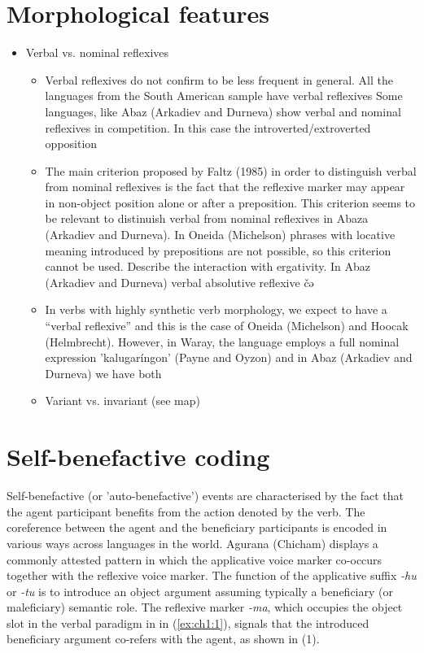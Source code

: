 \documentclass[output=paper]{langsci/langscibook}
\begin{document}
\section{Morphological features}
\begin{itemize}
\item Verbal vs. nominal reflexives
\begin{itemize}
\item Verbal reflexives do not confirm to be less frequent in general. All the languages from the South American sample have verbal reflexives
Some languages, like Abaz (Arkadiev and Durneva) show verbal and nominal reflexives in competition. In this case the introverted/extroverted opposition  
\item The main criterion proposed by Faltz (1985) in order to distinguish verbal from nominal reflexives is the fact that the reflexive marker may appear in non-object position alone or after a preposition. This criterion seems to be relevant to distinuish verbal from nominal reflexives in  Abaza (Arkadiev and Durneva). In Oneida (Michelson) phrases with locative meaning introduced by prepositions are not possible, so this criterion cannot be used.
Describe the interaction with ergativity. In Abaz (Arkadiev and Durneva)  verbal absolutive reflexive čə
\item In verbs with highly synthetic verb morphology, we expect to have a “verbal reflexive” and this is the case of Oneida (Michelson) and Hoocak (Helmbrecht). However, in Waray, the language employs a full nominal expression 'kalugaríngon' (Payne and Oyzon) and in Abaz (Arkadiev and Durneva) we have both
\item Variant vs. invariant (see map)
\end{itemize}
\end{itemize}

\section{Self-benefactive coding}

Self-benefactive (or 'auto-benefactive') events are characterised by the fact that the agent participant benefits from the action denoted by the verb. The coreference between the agent and the beneficiary participants is encoded in various ways across languages in the world. Agurana (Chicham) displays a commonly attested pattern in which the applicative voice marker co-occurs together with the reflexive voice marker. The function of the applicative suffix \emph{-hu} or \emph{-tu} is to introduce an object argument assuming typically a beneficiary (or maleficiary) semantic role. The reflexive marker \emph{-ma}, which occupies the object slot in the verbal paradigm in in (\ref{ex:ch1:1}), signals that the introduced beneficiary argument co-refers with the agent, as shown in (1).
\end{document}
